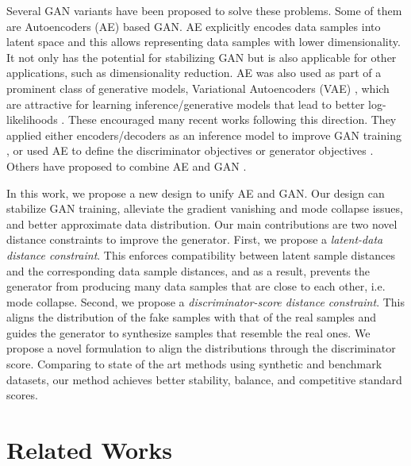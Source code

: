 \documentclass[runningheads]{llncs}
\begin{document}
Several GAN variants have been  proposed \cite{radford-arxiv-2015,metz-arxiv-2016,salimans-nisp-2016,arjovsky-arxiv-2017,yazici-arxiv-2018} to solve these problems. Some of them are Autoencoders (AE) based GAN. AE explicitly encodes data samples into latent space and this allows representing data samples with lower dimensionality. It not only has the potential for stabilizing GAN but is also applicable for other applications, such as dimensionality reduction. AE was also used as part of a prominent class of generative models, Variational Autoencoders (VAE) \cite{kingma-arxiv-2013,rezende-icml-2014,burda-arxiv-2015}, which are attractive for learning inference/generative models that lead to better log-likelihoods \cite{wu-arxiv-2016}. These encouraged many recent works following this direction. They applied either encoders/decoders as an inference model to improve GAN training \cite{dumoulin-arxiv-2016,donahue-arxiv-2016,li-arxiv-2017}, or used AE to define the discriminator objectives \cite{zhao-arxiv-2016,berthelot-arxiv-2017} or generator objectives \cite{che-arxiv-2016,warde-arxiv-2016}. Others have proposed to combine AE and GAN \cite{makhzani-arxiv-2015,larsen-arxiv-2015}. 

In this work, we propose a new design to unify AE and GAN. Our design can  stabilize  GAN training, alleviate the gradient vanishing and mode collapse issues, and better approximate data distribution. Our main contributions are two novel distance constraints to improve the generator. First, we propose a {\em latent-data distance constraint}. This enforces compatibility between latent sample distances and the corresponding data sample distances, and as a result, prevents the generator from producing many data samples that are close to each other, i.e. mode collapse. Second, we propose a {\em discriminator-score distance constraint}. This aligns the distribution of the fake samples with that of the real samples and  guides the generator to synthesize samples that resemble the real ones. We propose a novel formulation to align the distributions through the discriminator score. Comparing to state of the art methods using synthetic and benchmark datasets, our method achieves better stability, balance, and competitive standard scores. 
\section{Related Works}
\end{document}
